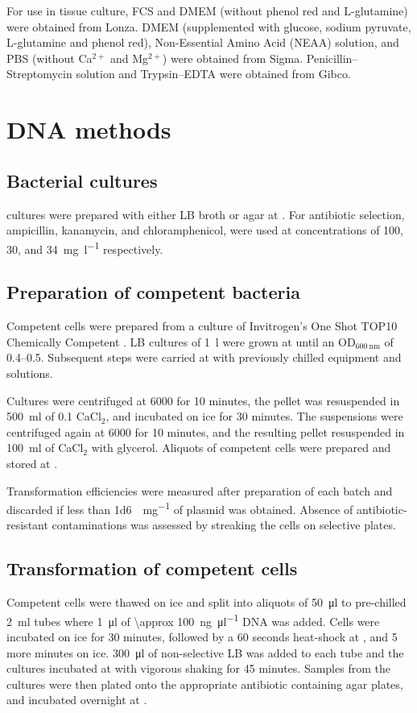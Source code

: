   For use in tissue culture, FCS and DMEM (without phenol red and L-glutamine)
  were obtained from Lonza.  DMEM (supplemented with glucose, sodium pyruvate,
  L-glutamine and phenol red), Non-Essential Amino Acid (NEAA) solution, and
  PBS (without Ca$^{2+}$ and Mg$^{2+}$) were obtained from Sigma.
  Penicillin--Streptomycin
  solution and Trypsin--EDTA were obtained from Gibco.

  \section{DNA methods}
    \subsection{Bacterial cultures}
       cultures were prepared with either LB broth or agar
      at . For antibiotic selection, ampicillin, kanamycin, and
      chloramphenicol, were used at concentrations of 100, 30,
      and \SI{34}{\mg\per\l} respectively.

    \subsection{Preparation of competent bacteria}
      Competent  cells were prepared from a culture of
      Invitrogen's One Shot TOP10 Chemically Competent . LB
      cultures of \SI{1}{\l} were grown at  until an OD$_{\SI{600}{\nm}}$
      of \numrange{0.4}{0.5}.  Subsequent steps were carried at  with
      previously chilled equipment and solutions.

      Cultures were centrifuged at \SI{6000}{\gn} for 10 minutes, the
      pellet was resuspended in \SI{500}{\ml} of \SI{0.1}{\mM} CaCl$_2$, and
      incubated on ice for 30 minutes. The suspensions were centrifuged
      again at \SI{6000}{\gn} for 10 minutes,
      and the resulting pellet resuspended in
      \SI{100}{\ml} of CaCl$_2$ with  glycerol. Aliquots of
      competent cells were prepared and stored at .

      Transformation efficiencies were measured after preparation of each
      batch and discarded if less than \SI{1d6}{\cfu\per\mg} of plasmid was
      obtained. Absence of antibiotic-resistant contaminations was assessed
      by streaking the cells on selective plates.

    \subsection{Transformation of competent cells}
      Competent cells were thawed on ice and split into aliquots of
      \SI{50}{\ul} to pre-chilled \SI{2}{\ml} tubes where
      \SI{1}{\ul} of \SI{\approx 100}{\ng\per\ul} DNA
      was added. Cells were incubated on ice for 30 minutes, followed by a
      60 seconds heat-shock at , and 5 more minutes on ice.
      \SI{300}{\ul} of non-selective LB was added to each tube and the
      cultures incubated at  with vigorous shaking for 45 minutes.
      Samples from the cultures were then plated onto the appropriate
      antibiotic containing agar plates, and incubated overnight at .


